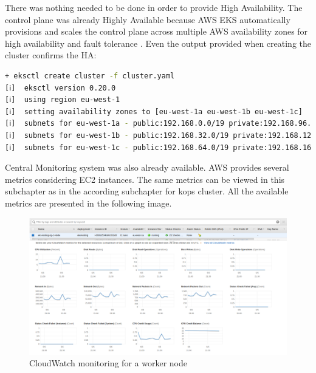 There was nothing needed to be done in order to provide High Availability. The control plane was already Highly Available because AWS EKS automatically provisions and scales the control plane across multiple AWS availability zones for high availability and fault tolerance \cite{eks-faqs}. Even the output provided when creating the cluster confirms the HA:
\begin{lstlisting}[basicstyle=\tiny,caption={Output from creating a eksctl cluster},captionpos=b,language=Bash,xleftmargin=1cm]
+ eksctl create cluster -f cluster.yaml
[ℹ]  eksctl version 0.20.0
[ℹ]  using region eu-west-1
[ℹ]  setting availability zones to [eu-west-1a eu-west-1b eu-west-1c]
[ℹ]  subnets for eu-west-1a - public:192.168.0.0/19 private:192.168.96.0/19
[ℹ]  subnets for eu-west-1b - public:192.168.32.0/19 private:192.168.128.0/19
[ℹ]  subnets for eu-west-1c - public:192.168.64.0/19 private:192.168.160.0/19
\end{lstlisting}

Central Monitoring system was also already available. AWS provides several metrics considering EC2 instances. The same metrics can be viewed in this subchapter as in the according subchapter for kops cluster. All the available metrics are presented in the following image.
\begin{figure}[H]
    \centering
    \includegraphics[width=17cm]{figures/eks-monitoring-ec2-node.png}
    \captionsetup{justification=centering,margin=2cm}
    \caption{CloudWatch monitoring for a worker node}
\end{figure}

